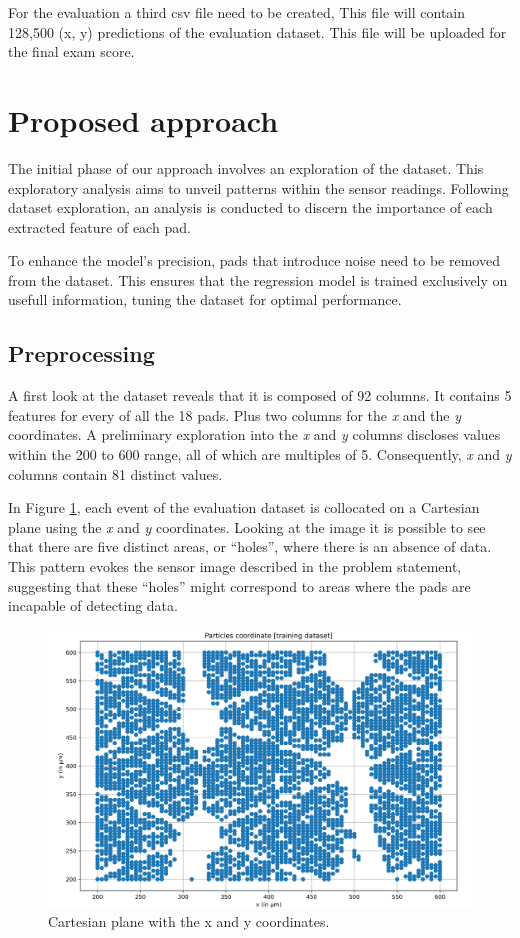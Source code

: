 \documentclass[conference]{IEEEtran}
\begin{document}
For the evaluation a third csv file need to be created, This file will contain 128,500 (x, y) 
predictions of the evaluation dataset.
This file will be uploaded for the final exam score.


\section{Proposed approach}
The initial phase of our approach involves an exploration of the dataset.
This exploratory analysis aims to unveil patterns within the sensor readings.
Following dataset exploration, an analysis is conducted to discern the importance of
each extracted feature of each pad.

To enhance the model's precision, pads that introduce noise need to be removed from the dataset. 
This ensures that the regression model is trained exclusively on usefull information, 
tuning the dataset for optimal performance.


\subsection{Preprocessing}
A first look at the dataset reveals that it is composed of 92 columns. 
It contains 5 features for every of all the 18 pads.
Plus two columns for the \textit{x} and the \textit{y} coordinates.
A preliminary exploration into the \textit{x} and \textit{y} columns discloses values 
within the 200 to 600 range, all of which are multiples of 5. Consequently, 
\textit{x} and \textit{y} columns contain 81 distinct values.

In Figure \ref{fig:cartesian_plane}, each event of the evaluation dataset is collocated on a Cartesian plane 
using the \textit{x} and \textit{y} coordinates. Looking at the image it is possible to see that there 
are five distinct areas, or “holes”, where there is an absence of data.
This pattern evokes the sensor image described in the problem statement, suggesting that these 
“holes” might correspond to areas where the pads are incapable of detecting data.\\

\begin{figure}[htbp]
\centerline{\includegraphics[width=\linewidth]{media/plot_dataset.png}}
\caption{Cartesian plane with the x and y coordinates.}
\label{fig:cartesian_plane}
\end{figure}
\end{document}
